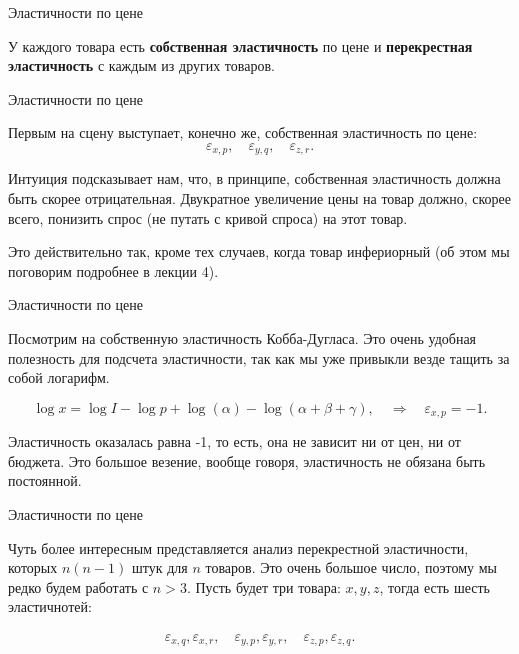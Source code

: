 \documentclass{beamer}
\begin{document}
\begin{frame}{Эластичности по цене}

У каждого товара есть \textbf{собственная эластичность} по цене и \textbf{перекрестная эластичность} с каждым из других товаров. 

\end{frame}

\begin{frame}{Эластичности по цене}

Первым на сцену выступает, конечно же, собственная эластичность по цене:
$$\varepsilon_{x,p}, \quad \varepsilon_{y,q}, \quad \varepsilon_{z,r}.$$

Интуиция подсказывает нам, что, в принципе, собственная эластичность должна быть скорее отрицательная. Двукратное увеличение цены на товар должно, скорее всего, понизить спрос (не путать с кривой спроса) на этот товар. 

Это действительно так, кроме тех случаев, когда товар инфериорный (об этом мы поговорим подробнее в лекции 4).

\end{frame}

\begin{frame}{Эластичности по цене}

Посмотрим на собственную эластичность Кобба-Дугласа. Это очень удобная полезность для подсчета эластичности, так как мы уже привыкли везде тащить за собой логарифм.

$$\log x = \log I - \log p + \log(\alpha) - \log(\alpha + \beta + \gamma), \quad \Rightarrow \quad \varepsilon_{x,p} = -1.$$

Эластичность оказалась равна -1, то есть, она не зависит ни от цен, ни от бюджета. Это большое везение, вообще говоря, эластичность не обязана быть постоянной.

\end{frame}

\begin{frame}{Эластичности по цене}

Чуть более интересным представляется анализ перекрестной эластичности, которых $n(n-1)$ штук для $n$ товаров. Это очень большое число, поэтому мы редко будем работать с $n>3$. Пусть будет три товара: $x,y,z$, тогда есть шесть эластичнотей:

\begin{gather*}
\varepsilon_{x,q}, \varepsilon_{x,r}, \quad \varepsilon_{y,p}, \varepsilon_{y,r}, \quad \varepsilon_{z,p}, \varepsilon_{z,q}.
\end{gather*}

\end{frame}
\end{document}
